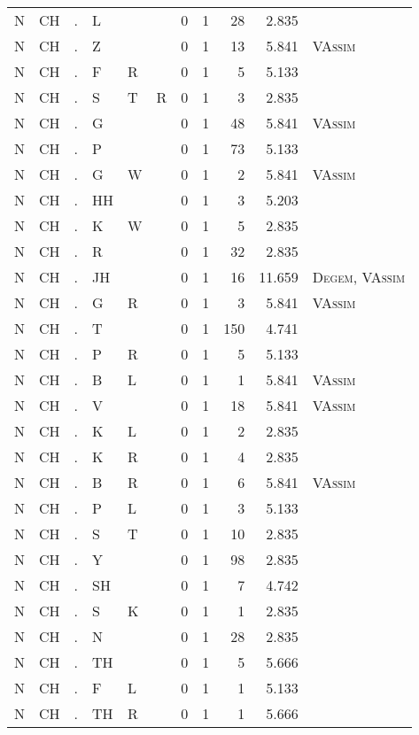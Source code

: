 \begin{longtable}{r@{ } r@{ } c@{ } l@{ } l@{ } l@{ } r r r r l }
N & CH & . & L &  &  & 0 & 1 & 28 & 2.835 &  \\
N & CH & . & Z &  &  & 0 & 1 & 13 & 5.841 & \textsc{VAssim} \\
N & CH & . & F & R &  & 0 & 1 & 5 & 5.133 &  \\
N & CH & . & S & T & R & 0 & 1 & 3 & 2.835 &  \\
N & CH & . & G &  &  & 0 & 1 & 48 & 5.841 & \textsc{VAssim} \\
N & CH & . & P &  &  & 0 & 1 & 73 & 5.133 &  \\
N & CH & . & G & W &  & 0 & 1 & 2 & 5.841 & \textsc{VAssim} \\
N & CH & . & HH &  &  & 0 & 1 & 3 & 5.203 &  \\
N & CH & . & K & W &  & 0 & 1 & 5 & 2.835 &  \\
N & CH & . & R &  &  & 0 & 1 & 32 & 2.835 &  \\
N & CH & . & JH &  &  & 0 & 1 & 16 & 11.659 & \textsc{Degem}, \textsc{VAssim} \\
N & CH & . & G & R &  & 0 & 1 & 3 & 5.841 & \textsc{VAssim} \\
N & CH & . & T &  &  & 0 & 1 & 150 & 4.741 &  \\
N & CH & . & P & R &  & 0 & 1 & 5 & 5.133 &  \\
N & CH & . & B & L &  & 0 & 1 & 1 & 5.841 & \textsc{VAssim} \\
N & CH & . & V &  &  & 0 & 1 & 18 & 5.841 & \textsc{VAssim} \\
N & CH & . & K & L &  & 0 & 1 & 2 & 2.835 &  \\
N & CH & . & K & R &  & 0 & 1 & 4 & 2.835 &  \\
N & CH & . & B & R &  & 0 & 1 & 6 & 5.841 & \textsc{VAssim} \\
N & CH & . & P & L &  & 0 & 1 & 3 & 5.133 &  \\
N & CH & . & S & T &  & 0 & 1 & 10 & 2.835 &  \\
N & CH & . & Y &  &  & 0 & 1 & 98 & 2.835 &  \\
N & CH & . & SH &  &  & 0 & 1 & 7 & 4.742 &  \\
N & CH & . & S & K &  & 0 & 1 & 1 & 2.835 &  \\
N & CH & . & N &  &  & 0 & 1 & 28 & 2.835 &  \\
N & CH & . & TH &  &  & 0 & 1 & 5 & 5.666 &  \\
N & CH & . & F & L &  & 0 & 1 & 1 & 5.133 &  \\
N & CH & . & TH & R &  & 0 & 1 & 1 & 5.666 &  \\

\end{longtable}
